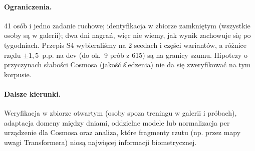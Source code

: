 \paragraph{Ograniczenia.} 41 osób i jedno zadanie ruchowe; identyfikacja w zbiorze zamkniętym
(wszystkie osoby są w galerii); dwa dni nagrań, więc nie wiemy, jak wynik zachowuje się po
tygodniach. Przepis S4 wybieraliśmy na 2 seedach i części wariantów, a różnice rzędu
$\pm 1{,}5$~p.p. na dev (do ok.~9 prób z 615) są na granicy szumu. Hipotezy o przyczynach słabości Cosmosa
(jakość śledzenia) nie da się zweryfikować na tym korpusie.

\paragraph{Dalsze kierunki.} Weryfikacja w zbiorze otwartym (osoby spoza treningu w galerii i
próbach), adaptacja domeny między dniami, oddzielne modele lub normalizacja per urządzenie dla
Cosmosa oraz analiza, które fragmenty rzutu (np. przez mapy uwagi Transformera) niosą najwięcej
informacji biometrycznej.
